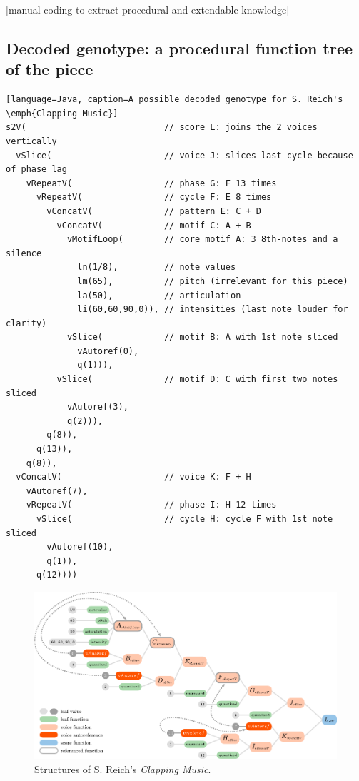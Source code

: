 \documentclass{article}
\begin{document}
{\color{red}

[manual coding to extract procedural and extendable knowledge]\cite{Hofmann2015} 

}

\subsection{Decoded genotype: a procedural function tree of the piece}

\begin{lstlisting}[float][language=Java, caption=A possible decoded genotype for S. Reich's \emph{Clapping Music}]
s2V(                           // score L: joins the 2 voices vertically
  vSlice(                      // voice J: slices last cycle because of phase lag
    vRepeatV(                  // phase G: F 13 times
      vRepeatV(                // cycle F: E 8 times 
        vConcatV(              // pattern E: C + D
          vConcatV(            // motif C: A + B
            vMotifLoop(        // core motif A: 3 8th-notes and a silence
              ln(1/8),         // note values
              lm(65),          // pitch (irrelevant for this piece)
              la(50),          // articulation
              li(60,60,90,0)), // intensities (last note louder for clarity) 
            vSlice(            // motif B: A with 1st note sliced
              vAutoref(0),
              q(1))),
          vSlice(              // motif D: C with first two notes sliced
            vAutoref(3),
            q(2))),
        q(8)),
      q(13)),
    q(8)),
  vConcatV(                    // voice K: F + H
    vAutoref(7),
    vRepeatV(                  // phase I: H 12 times 
      vSlice(                  // cycle H: cycle F with 1st note sliced
        vAutoref(10),
        q(1)),
      q(12))))
\end{lstlisting}

\begin{figure}
  \includegraphics[width=\linewidth]{figs/clapping_tree_graph_colours_code.pdf}
  \caption{Structures of S. Reich's \emph{Clapping Music}.}
  \label{fig:boat2}
\end{figure}
\end{document}
